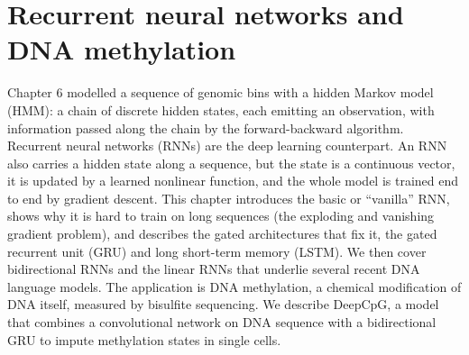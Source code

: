 
\providecommand{\R}{\mathbb{R}}
\providecommand{\E}{\mathbb{E}}
\providecommand{\Normal}{\mathcal{N}}
\providecommand{\argmax}{\operatorname*{arg\,max}}
\providecommand{\argmin}{\operatorname*{arg\,min}}
\providecommand{\vy}{\mathbf{y}}
\providecommand{\vx}{\mathbf{x}}
\providecommand{\mX}{\mathbf{X}}
\providecommand{\mI}{\mathbf{I}}
\providecommand{\vb}{\boldsymbol{\beta}}
\providecommand{\veps}{\boldsymbol{\epsilon}}
\providecommand{\vp}{\mathbf{p}}
\providecommand{\vg}{\mathbf{g}}
\providecommand{\ind}{\mathbf{1}}
\providecommand{\vh}{\mathbf{h}}
\providecommand{\va}{\mathbf{a}}
\providecommand{\vc}{\mathbf{c}}
\providecommand{\vz}{\mathbf{z}}
\providecommand{\vr}{\mathbf{r}}
\providecommand{\vi}{\mathbf{i}}
\providecommand{\vo}{\mathbf{o}}
\providecommand{\vf}{\mathbf{f}}
\providecommand{\vu}{\mathbf{u}}
\providecommand{\vbias}{\mathbf{b}}
\providecommand{\vone}{\mathbf{1}}
\providecommand{\vphi}{\boldsymbol{\phi}}
\providecommand{\vpi}{\boldsymbol{\pi}}
\providecommand{\vtheta}{\boldsymbol{\theta}}
\providecommand{\vdelta}{\boldsymbol{\delta}}
\providecommand{\mW}{\mathbf{W}}
\providecommand{\mJ}{\mathbf{J}}
\providecommand{\mT}{\mathbf{T}}
\providecommand{\diag}{\operatorname{diag}}

\providecommand{\chaptertoc}{}
\chapter{Recurrent neural networks and DNA methylation}
\label{ch:rnn}
\chaptertoc

Chapter 6 modelled a sequence of genomic bins with a hidden Markov model (HMM): a chain of discrete hidden states, each emitting an observation, with information passed along the chain by the forward-backward algorithm. Recurrent neural networks (RNNs) are the deep learning counterpart. An RNN also carries a hidden state along a sequence, but the state is a continuous vector, it is updated by a learned nonlinear function, and the whole model is trained end to end by gradient descent. This chapter introduces the basic or ``vanilla'' RNN, shows why it is hard to train on long sequences (the exploding and vanishing gradient problem), and describes the gated architectures that fix it, the gated recurrent unit (GRU) and long short-term memory (LSTM). We then cover bidirectional RNNs and the linear RNNs that underlie several recent DNA language models. The application is DNA methylation, a chemical modification of DNA itself, measured by bisulfite sequencing. We describe DeepCpG, a model that combines a convolutional network on DNA sequence with a bidirectional GRU to impute methylation states in single cells.

